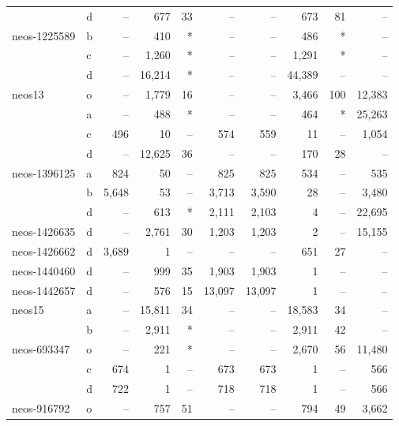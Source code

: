 \documentclass[11.5pt]{article}
\begin{document}
\begin{table}[H]
\begin{tabular}{l|l|rrr|rrrr|r}
                  & d & --    & 677   & 33 & --     & --    & 673   & 81   & --\\
neos-1225589      & b & --    & 410   & *  & --     & --    & 486   & *    & -- \\
                  & c & --    & 1,260 & *  & --     & --    & 1,291 & *    & -- \\
                  & d & --    & 16,214& *  & --     & --    & 44,389& --   & -- \\
neos13            & o & --    & 1,779 & 16 & --     & --    & 3,466 & 100  & 12,383\\ 
                  & a & --    & 488   & *  & --     & --    & 464   & *    & 25,263\\
                  & c & 496   & 10    & -- & 574    & 559   & 11    & --   & 1,054\\  
                  & d & --    & 12,625& 36 & --     & --    & 170   & 28   & --\\ 
neos-1396125      & a & 824   & 50    & -- & 825    & 825   & 534   & --   & 535\\
                  & b & 5,648 & 53    & -- & 3,713  & 3,590 & 28    & --   & 3,480\\
                  & d & --    & 613   & *  & 2,111  & 2,103 & 4     & --   & 22,695\\
neos-1426635      & d & --    & 2,761 & 30 & 1,203  & 1,203 & 2     & --   & 15,155\\
neos-1426662      & d & 3,689 & 1     & -- & --     & --    & 651   & 27   & --\\
neos-1440460      & d & --    & 999   & 35 & 1,903  & 1,903 & 1     & --   & --\\
neos-1442657      & d & --    & 576   & 15 & 13,097 & 13,097& 1     & --   & --\\
neos15            & a & --    & 15,811& 34 & --     & --    & 18,583& 34   & --\\
                  & b & --    & 2,911 & *  & --     & --    & 2,911 & 42   & --\\
neos-693347       & o & --    & 221   & *  & --     & --    & 2,670 & 56   & 11,480\\ 
                  & c & 674   & 1     & -- & 673    & 673   & 1     & --   & 566\\ 
                  & d & 722   & 1     & -- & 718    & 718   & 1     & --   & 566\\ 
neos-916792       & o & --    & 757   & 51 & --     & --    & 794   & 49   & 3,662\\

\end{tabular}
\end{table}
\end{document}
